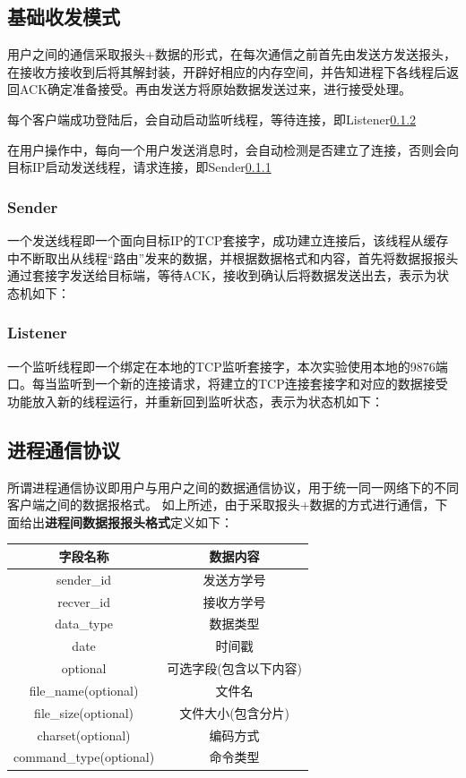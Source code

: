 \documentclass[UTF8]{ctexart}
\begin{document}
\subsection{基础收发模式}

用户之间的通信采取报头+数据的形式，在每次通信之前首先由发送方发送报头，在接收方接收到后将其解封装，开辟好相应的内存空间，并告知进程下各线程后返回ACK确定准备接受。再由发送方将原始数据发送过来，进行接受处理。

每个客户端成功登陆后，会自动启动监听线程，等待连接，即Listener\ref{listener}

在用户操作中，每向一个用户发送消息时，会自动检测是否建立了连接，否则会向目标IP启动发送线程，请求连接，即Sender\ref{sender}

\subsubsection{Sender}\label{sender}
一个发送线程即一个面向目标IP的TCP套接字，成功建立连接后，该线程从缓存中不断取出从线程“路由”发来的数据，并根据数据格式和内容，首先将数据报报头通过套接字发送给目标端，等待ACK，接收到确认后将数据发送出去，表示为状态机如下：


\subsubsection{Listener}\label{listener}
一个监听线程即一个绑定在本地的TCP监听套接字，本次实验使用本地的9876端口。每当监听到一个新的连接请求，将建立的TCP连接套接字和对应的数据接受功能放入新的线程运行，并重新回到监听状态，表示为状态机如下：


\subsection{进程通信协议}\label{progress}
所谓进程通信协议即用户与用户之间的数据通信协议，用于统一同一网络下的不同客户端之间的数据报格式。
如上所述，由于采取报头+数据的方式进行通信，下面给出\textbf{进程间数据报报头格式}定义如下：
\begin{table}[H]
    \centering
    \begin{tabular}{cc}
        \hline
        字段名称 & 数据内容 \\
        \hline
        sender\_id & 发送方学号\\
        recver\_id & 接收方学号\\
        data\_type & 数据类型\\
        date & 时间戳\\
        optional & 可选字段(包含以下内容)\\
        file\_name(optional) & 文件名\\
        file\_size(optional) & 文件大小(包含分片)\\
        charset(optional) & 编码方式\\
        command\_type(optional) & 命令类型\\
        \hline
    \end{tabular}
\end{table}
\end{document}
